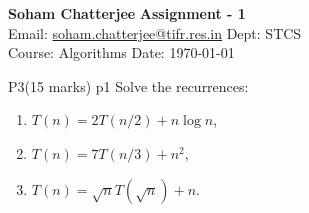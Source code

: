 \documentclass[a4paper, 11pt]{article}
\begin{document}
	
	
	\textsf{\noindent \large\textbf{Soham Chatterjee} \hfill \textbf{Assignment - 1}\\
		Email: \href{soham.chatterjee@tifr.res.in}{soham.chatterjee@tifr.res.in} \hfill Dept: STCS\\
		\normalsize Course: Algorithms \hfill Date: \today}
	
	
\begin{problem}{%
		P3\hfill  (15 marks)
	}{p1%
}
Solve the recurrences: \begin{enumerate}[label=(\roman*)]
	\item $T(n)=2 T(n / 2)+n \log n$, \label{nlog2n}
	\item $T(n)=7 T(n / 3)+n^2$, 
	\item $T(n)=\sqrt{n} T(\sqrt{n})+n$.
\end{enumerate}

\end{problem}
\end{document}
